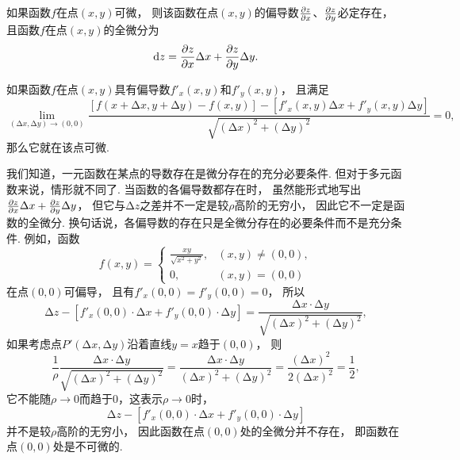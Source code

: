 \begin{theorem}[必要条件2]\label{theorem:多元函数微分法.二元函数可微的必要条件}
如果函数\(f\)在点\((x,y)\)可微，
则该函数在点\((x,y)\)的偏导数\(\pdv{z}{x}\)、\(\pdv{z}{y}\)必定存在，
且函数\(f\)在点\((x,y)\)的全微分为\begin{equation*}
	\dd{z} = \pdv{z}{x} \Delta x + \pdv{z}{y} \Delta y.
\end{equation*}
\end{theorem}

\begin{theorem}\label{theorem:多元函数微分法.二元函数可微的充分必要条件}
如果函数\(f\)在点\((x,y)\)具有偏导数\(f'_x(x,y)\)和\(f'_y(x,y)\)，
且满足\begin{equation*}
	\lim_{(\increment x,\increment y)\to(0,0)}
	\frac{
		[f(x+\increment x,y+\increment y)-f(x,y)]
		-[f'_x(x,y) \increment x + f'_y(x,y) \increment y]
	}{
		\sqrt{(\increment x)^2+(\increment y)^2}
	} = 0,
\end{equation*}那么它就在该点可微.
\end{theorem}

我们知道，一元函数在某点的导数存在是微分存在的充分必要条件.
但对于多元函数来说，情形就不同了.
当函数的各偏导数都存在时，
虽然能形式地写出\(\pdv{z}{x} \Delta x + \pdv{z}{y} \Delta y\)，
但它与\(\increment z\)之差并不一定是较\(\rho\)高阶的无穷小，
因此它不一定是函数的全微分.
换句话说，各偏导数的存在只是全微分存在的必要条件而不是充分条件.
例如，函数\begin{equation*}
	f(x,y) = \left\{ \begin{array}{cl}
		\frac{xy}{\sqrt{x^2+y^2}}, & (x,y)\neq(0,0), \\
		0, & (x,y)=(0,0)
	\end{array} \right.
\end{equation*}在点\((0,0)\)可偏导，
且有\(f'_x(0,0) = f'_y(0,0) = 0\)，
所以\begin{equation*}
	\increment z - [f'_x(0,0) \cdot \increment x + f'_y(0,0) \cdot \increment y]
	= \frac{\increment x \cdot \increment y}{\sqrt{(\increment x)^2+(\increment y)^2}},
\end{equation*}
如果考虑点\(P'(\increment x,\increment y)\)沿着直线\(y=x\)趋于\((0,0)\)，
则\begin{equation*}
	\frac{1}{\rho} \frac{\increment x \cdot \increment y}{\sqrt{(\increment x)^2+(\increment y)^2}}
	= \frac{\increment x \cdot \increment y}{(\increment x)^2+(\increment y)^2}
	= \frac{(\increment x)^2}{2(\increment x)^2}
	= \frac{1}{2},
\end{equation*}
它不能随\(\rho\to0\)而趋于\(0\)，这表示\(\rho\to0\)时，\begin{equation*}
	\increment z - [f'_x(0,0) \cdot \increment x + f'_y(0,0) \cdot \increment y]
\end{equation*}并不是较\(\rho\)高阶的无穷小，
因此函数在点\((0,0)\)处的全微分并不存在，
即函数在点\((0,0)\)处是不可微的.

